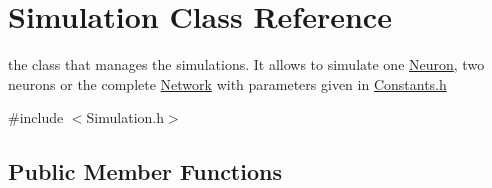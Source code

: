 \hypertarget{classSimulation}{}\section{Simulation Class Reference}
\label{classSimulation}


the class that manages the simulations. It allows to simulate one \hyperlink{classNeuron}{Neuron}, two neurons or the complete \hyperlink{classNetwork}{Network} with parameters given in \hyperlink{Constants_8h_source}{Constants.\+h}  




{\ttfamily \#include $<$Simulation.\+h$>$}

\subsection*{Public Member Functions}
